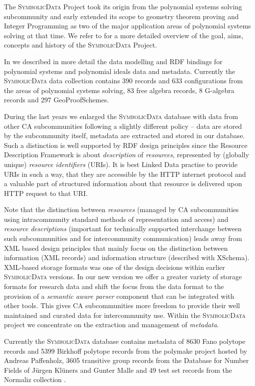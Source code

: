 \documentclass{mathincs}
\newcommand{\SD}{\textsc{Symbo\-lic\-Data}}
\begin{document}
The {\SD} Project took its origin from the polynomial systems solving
subcommunity and early extended its scope to geometry theorem proving and
Integer Programming as two of the major application areas of polynomial systems
solving at that time. We refer to \cite{cicm-14} for a more detailed overview
of the goal, aims, concepts and history of the {\SD} Project.

In \cite{car-55} we described in more detail the data modelling and RDF
bindings for polynomial systems and polynomial ideals data and metadata.
Currently the {\SD} data collection contains 390 records and 633 configurations
from the areas of polynomial systems solving, 83 free algebra records, 8
G-algebra records and 297 GeoProofSchemes.

During the last years we enlarged the {\SD} database with data from other CA
subcommunities following a slightly different policy -- data are stored by the
subcommunity itself, metadata are extracted and stored in our database.  Such a
distinction is well supported by RDF design principles since the Resource
Description Framework is about \emph{description} of \emph{resources},
represented by (globally unique) \emph{resource identifiers} (URIs). It is best
Linked Data practise to provide URIs in such a way, that they are accessible by
the HTTP internet protocol and a valuable part of structured information about
that resource is delivered upon HTTP request to that URI.

Note that the distinction between \emph{resources} (managed by CA
subcommunities using intracommunity standard methods of representation and
access) and \emph{resource descriptions} (important for technically supported
interchange between such subcommunities and for intercommunity communication)
leads away from XML based design principles that mainly focus on the
distinction between information (XML records) and information structure
(described with XSchema).  XML-based storage formats was one of the design
decisions within earlier {\SD} versions.  In our new version we offer a greater
variety of storage formats for research data and shift the focus from the data
format to the provision of a \emph{semantic aware parser} component that can be
integrated with other tools.  This gives CA subcommunities more freedom to
provide their well maintained and curated data for intercommunity use.  Within
the {\SD} project we concentrate on the extraction and management of
\emph{metadata}.  

Currently the {\SD} database contains metadata of 8630 Fano polytope records
\cite{fano} and 5399 Birkhoff polytope records \cite{birkhoff} from the
polymake project \cite{polymake} hosted by Andreas Paffenholz, 3605 transitive
group records from the Database for Number Fields \cite{MalleKlueners} of
J\"urgen Kl\"uners and Gunter Malle and 49 test set records from the Normaliz
collection \cite{normaliz}.
\end{document}
